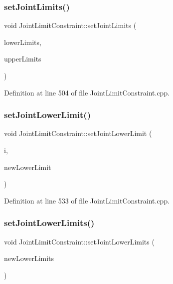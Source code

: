 \subsubsection{\texorpdfstring{set\+Joint\+Limits()}{setJointLimits()}}
{\footnotesize\ttfamily void Joint\+Limit\+Constraint\+::set\+Joint\+Limits (\begin{DoxyParamCaption}\item[{const Eigen\+::\+Vector\+Xd \&}]{lower\+Limits,  }\item[{const Eigen\+::\+Vector\+Xd \&}]{upper\+Limits }\end{DoxyParamCaption})}



Definition at line 504 of file Joint\+Limit\+Constraint.\+cpp.

\hypertarget{classocra_1_1JointLimitConstraint_abeac7915f147b24c8afd43ba44ce000c}{}\label{classocra_1_1JointLimitConstraint_abeac7915f147b24c8afd43ba44ce000c} 
\subsubsection{\texorpdfstring{set\+Joint\+Lower\+Limit()}{setJointLowerLimit()}}
{\footnotesize\ttfamily void Joint\+Limit\+Constraint\+::set\+Joint\+Lower\+Limit (\begin{DoxyParamCaption}\item[{int}]{i,  }\item[{double}]{new\+Lower\+Limit }\end{DoxyParamCaption})}



Definition at line 533 of file Joint\+Limit\+Constraint.\+cpp.

\hypertarget{classocra_1_1JointLimitConstraint_a1ef49a88ac2646a45bac289a9b623b8f}{}\label{classocra_1_1JointLimitConstraint_a1ef49a88ac2646a45bac289a9b623b8f} 
\subsubsection{\texorpdfstring{set\+Joint\+Lower\+Limits()}{setJointLowerLimits()}}
{\footnotesize\ttfamily void Joint\+Limit\+Constraint\+::set\+Joint\+Lower\+Limits (\begin{DoxyParamCaption}\item[{const Eigen\+::\+Vector\+Xd \&}]{new\+Lower\+Limits }\end{DoxyParamCaption})}



